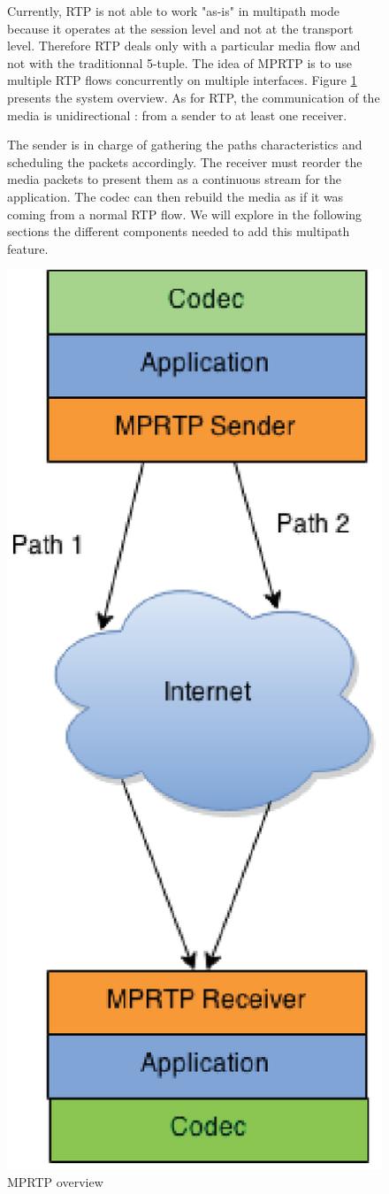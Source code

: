 \begin{figure}[!ht]

\begin{minipage}[c]{0.55\linewidth}

Currently, RTP is not able to work "as-is" in multipath mode because it operates at the session level and not at the transport level. Therefore RTP deals only with a particular media flow and not with the traditionnal 5-tuple. The idea of MPRTP is to use multiple RTP flows concurrently on multiple interfaces. Figure \ref{fig:mprtp-concept} presents the system overview. As for RTP, the communication of the media is unidirectional : from a sender to at least one receiver.

\vspace{10pt}

The sender is in charge of gathering the paths characteristics and scheduling the packets accordingly. The receiver must reorder the media packets to present them as a continuous stream for the application. The codec can then rebuild the media as if it was coming from a normal RTP flow. We will explore in the following sections the different components needed to add this multipath feature.

\end{minipage}
\begin{minipage}{0.44\linewidth}
\centering

\includegraphics[width=0.5\linewidth]{images/mprtp-overview}
\caption[MPRTP overview]{MPRTP overview}
\label{fig:mprtp-concept}

\end{minipage}

\end{figure}


